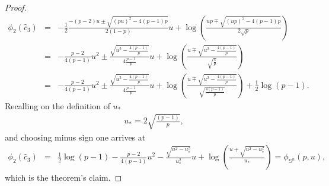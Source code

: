 \documentclass[10pt]{article}
\def\mS{{\mathbb S}}
\def\lp{\left (}
\def\rp{\right )}
\begin{document}
\begin{proof}
 \begin{eqnarray}
 \label{eq:ldpeq15}
\phi_2(\hat{c}_3)
& = &  -\frac{1}{2}  \frac{ -(p-2)u \pm \sqrt{ (pu)^2 - 4(p-1)p   }   }{2(1-p)} u + \log\lp \frac{ up \mp \sqrt{(up)^2 -4(p-1)p  } }{2\sqrt{p}}  \rp
\nonumber \\
& = &
  -\frac{p-2}{4(p-1)}u^2
  \pm \frac{ \sqrt{ u^2 - \frac{4(p-1)}{p}   }   }{4\frac{p-1}{p}} u  +  \log\lp  \frac {  u \mp \sqrt{  u^2 -\frac{4(p-1)}{p}  } }  { \sqrt{\frac{4}{p} }    }  \rp
\nonumber \\
 & = &
  -\frac{p-2}{4(p-1)}u^2
  \pm \frac{ \sqrt{ u^2 - \frac{4(p-1)}{p}   }   }{4\frac{p-1}{p}} u  + \log\lp \frac{ u \mp \sqrt{u^2 - \frac{4(p-1)}{p}  } }{\sqrt{\frac{4(p-1)}{p} } }  \rp  + \frac{1}{2} \log \lp p-1  \rp    .
  \end{eqnarray}
Recalling on the definition of $u_{*}$
\begin{eqnarray}
 \label{eq:ldpeq16}
u_* = 2 \sqrt{\frac{(p-1)}{p} } ,
  \end{eqnarray}
and choosing minus sign one arrives at
 \begin{eqnarray}
 \label{eq:ldpeq17}
\phi_2(\hat{c}_3)
  & = &
 \frac{1}{2} \log \lp p-1  \rp  -\frac{p-2}{4(p-1)}u^2
  - \frac{ \sqrt{ u^2 - u_*^2   }   }{u_*^2 } u  + \log\lp \frac{ u + \sqrt{u^2 -  u_*^2 } }{  u_*    }  \rp = \phi_{\mS^n}(p,u),
  \end{eqnarray}
  which is the theorem's claim.
\end{proof}
\end{document}
